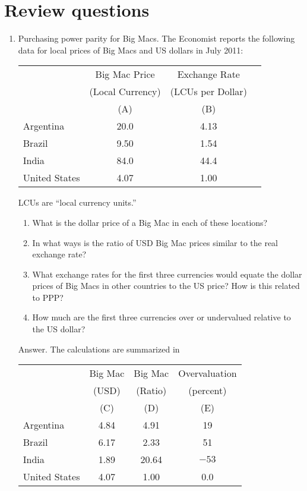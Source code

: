 \section*{Review questions}

\begin{enumerate}
\item Purchasing power parity for Big Macs.
The Economist reports the following data for
local prices of Big Macs and US dollars in July 2011:
%
\begin{center}
\begin{tabular}{lccc}
\toprule
        & Big Mac Price  &  Exchange Rate    \\
        &(Local Currency)&(LCUs per Dollar)   \\
        &  (A)  &  (B) \\
\midrule
Argentina       &  20.0  &  4.13  \\
Brazil          &  9.50  &  1.54 \\
India           &  84.0  &  44.4   \\
United States   &  4.07  &  1.00   \\
\bottomrule
\end{tabular}
\end{center}
LCUs are ``local currency units.''


\begin{enumerate}
\item What is the dollar price of a Big Mac in each of these locations?
\item In what ways is the ratio of USD Big Mac prices similar to the real exchange rate?
\item What exchange rates for the first three currencies would
equate the dollar prices of Big Macs in other countries to the US price?
How is this related to PPP?
\item How much are the first three currencies over or undervalued
relative to the US dollar?
\end{enumerate}

Answer.  The calculations are summarized in
%
{\small
\begin{center}
\begin{tabular}{lccc}
\toprule
        & Big Mac   &  Big Mac  & Overvaluation\\
        &  (USD)&   (Ratio) &  (percent)\\
        & (C) & (D) & (E)  \\
\midrule
Argentina       &  4.84 &  4.91  &  19\\
Brazil          &  6.17 &  2.33  & 51\\
India           &  1.89 &  20.64 & $-53$\\
United States   &  4.07 &  1.00  & 0.0\\
\bottomrule
\end{tabular}
\end{center}
}


\end{enumerate}
